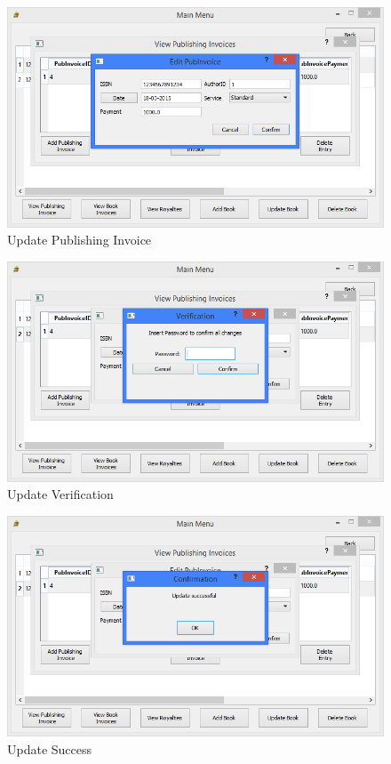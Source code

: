 \begin{figure}[H]
    \caption{Update Publishing Invoice} \label{fig:UpdatePubInvoice}
    \includegraphics[width=\textwidth]{./Maintenance/UserInterface/UpdatePubInvoice.png}
\end{figure}

\begin{figure}[H]
    \caption{Update Verification} \label{fig:UpdatePubInvoiceVerify}
    \includegraphics[width=\textwidth]{./Maintenance/UserInterface/UpdatePubInvoiceVerify.png}
\end{figure}

\begin{figure}[H]
    \caption{Update Success} \label{fig:UpdatePubInvoiceSuccess}
    \includegraphics[width=\textwidth]{./Maintenance/UserInterface/UpdatePubInvoiceSuccess.png}
\end{figure}

